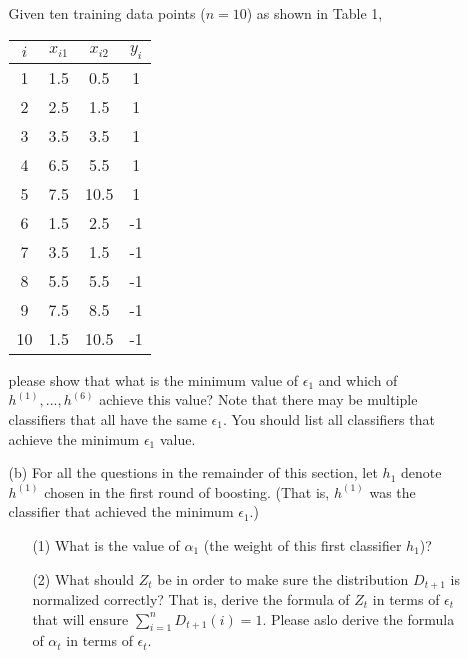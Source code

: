 \documentclass[10pt]{article}
\begin{document}
\begin{enumerate}[1.]
\begin{itemize}
                Given ten training data points ($n = 10$) as shown in Table 1,

                    \centering
                    \begin{tabular}{|c|cc|c|}
                    \hline
                    $i$ & $x_{i1}$ & $x_{i2}$ & $y_{i}$ \\ \hline
                    1 & 1.5 & 0.5 & 1 \\
                    2 & 2.5 & 1.5 & 1 \\
                    3 & 3.5 & 3.5 & 1 \\
                    4 & 6.5 & 5.5 & 1 \\
                    5 & 7.5 & 10.5 & 1 \\
                    6 & 1.5 & 2.5 & -1 \\
                    7 & 3.5 & 1.5 & -1 \\
                    8 & 5.5 & 5.5 & -1 \\
                    9 & 7.5 & 8.5 & -1 \\
                    10 & 1.5 & 10.5 & -1 \\
                    \hline
                    \end{tabular}

		        please show that what is the minimum value of $\epsilon_{1}$ and which of $h^{(1)},...,h^{(6)}$ achieve this value? Note that there may be multiple classifiers that all have the same $\epsilon_{1}$. You should list all classifiers that achieve the minimum $\epsilon_{1}$ value.~\\

	        \item[(b)] For all the questions in the remainder of this section, let $h_{1}$ denote $h^{(1)}$ chosen in the first round of boosting. (That is, $h^{(1)}$ was the classifier that achieved the minimum $\epsilon_{1}$.)
		        \begin{enumerate}
			        \item[(1)] What is the value of $\alpha_{1}$ (the weight of this first classifier $h_{1}$)? ~\\

			        \item[(2)] What should $Z_{t}$ be in order to make sure the distribution $D_{t+1}$ is normalized correctly? That is, derive the formula of $Z_{t}$ in terms of $\epsilon_{t}$ that will ensure $\sum_{i=1}^{n} D_{t+1}(i) = 1$. Please aslo derive the formula of $\alpha_{t}$ in terms of $\epsilon_{t}$. ~\\


\end{enumerate}
\end{itemize}
\end{enumerate}
\end{document}
